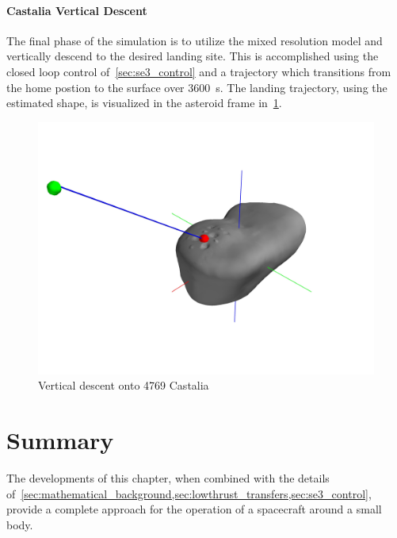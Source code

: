 \paragraph{Castalia Vertical Descent}
The final phase of the simulation is to utilize the mixed resolution model and vertically descend to the desired landing site. 
This is accomplished using the closed loop control of~\cref{sec:se3_control} and a trajectory which transitions from the home postion to the surface over \SI{3600}{\second}.
The landing trajectory, using the estimated shape, is visualized in the asteroid frame in~\cref{fig:castalia_landing}.
\begin{figure}[htbp]
    \centering
    \includegraphics[width=\textwidth]{figures/computational_geometry/dynamic_exploration/castalia/land/asteroid_trajectory.jpg}
    \caption{Vertical descent onto 4769 Castalia~\label{fig:castalia_landing}}
\end{figure}

\section{Summary}

The developments of this chapter, when combined with the details of~\cref{sec:mathematical_background,sec:lowthrust_transfers,sec:se3_control}, provide a complete approach for the operation of a spacecraft around a small body.
